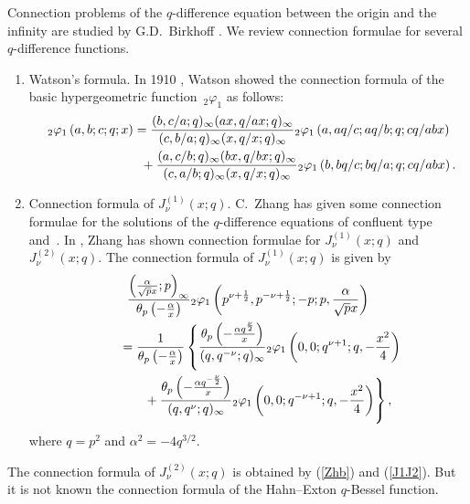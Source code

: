 \documentclass[pdftex]{sigma}
\begin{document}
Connection problems of the $q$-dif\/ference equation between the origin and the inf\/inity are studied by G.D.~Birkhof\/f \cite{Birkhoff}. We review connection formulae for several $q$-dif\/ference functions.
\begin{enumerate}\itemsep=0pt
\item Watson's formula.
In 1910 \cite{W}, Watson showed the connection formula of the basic hypergeometric function~${}_2\varphi_1$ as follows:
\begin{gather*}
{}_2 \varphi_1\left(a,b;c;q;x \right)=
\frac{(b,c/a;q)_\infty (a x,q/ a x;q)_\infty }{(c, b/a;q)_\infty (  x,q/   x;q)_\infty }
{}_2 \varphi_1\left(a,aq/c;aq/b;q;cq/abx \right) \nonumber \\
\hphantom{{}_2 \varphi_1\left(a,b;c;q;x \right)=}{} +
\frac{(a,c/b;q)_\infty (b x, q/ b x;q)_\infty }{(c, a/b;q)_\infty (  x,q/   x;q)_\infty }
{}_2 \varphi_1\left(b, bq/c; bq/a; q; cq/abx \right).
\end{gather*}
\item Connection formula of $J_\nu^{(1)}(x;q)$.
C.~Zhang has given some connection formulae for the solutions of the $q$-dif\/ference equations of conf\/luent type~\cite{Z0,Z1} and~\cite{Z2}. In \cite{Z1}, Zhang
has shown connection formulae for $J_\nu^{(1)}(x;q)$ and $J_\nu^{(2)}(x;q)$. The connection formula of $J_\nu^{(1)}(x;q)$ is given by
\begin{gather}
\frac{\left(\frac{\alpha}{\sqrt{p}x};p\right)_\infty}{\theta_p\left(-\frac{\alpha}{x}\right)}{}_2\varphi_1 \left(p^{\nu +\frac{1}{2}},p^{-\nu +\frac{1}{2}};-p;p,\frac{\alpha}{\sqrt{p}x}\right)\notag\\
\qquad{} =\frac{1}{\theta_p\left(-\frac{\alpha}{x}\right)}
 \left\{\frac{\theta_p\left(-\frac{\alpha q^{\frac{\nu}{2}}}{x}\right)}{(q,q^{-\nu};q)_\infty}{}_2\varphi_1\left(0,0;q^{\nu +1};q,-\frac{x^2}{4}\right)\right.\notag\\
\left.\qquad\quad{} + \frac{\theta_p\left(-\frac{\alpha q^{-\frac{\nu}{2}}}{x}\right)}{(q,q^{\nu};q)_\infty}{}_2\varphi_1\left(0,0;q^{-\nu +1};q,-\frac{x^2}{4}\right)
\right\},\label{Zhb}
\end{gather}
where $q=p^2$ and $\alpha^2=-4q^{3/2}$.
\end{enumerate}
The connection formula of $J_\nu^{(2)}(x;q)$ is obtained by (\ref{Zhb}) and (\ref{J1J2}).
But it is not known the connection formula of the Hahn--Exton $q$-Bessel function.
\end{document}
